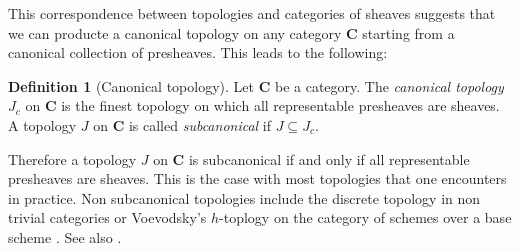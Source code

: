 \documentclass[12pt,reqno,a4paper]{amsart}
\theoremstyle{plain}
\theoremstyle{definition}
\newtheorem{defn}[thm]{Definition}
\theoremstyle{remark}
\begin{document}
This correspondence between topologies and categories of sheaves suggests that we can producte a canonical topology on any category $\mathbf{C}$ starting from a canonical collection of presheaves.
This leads to the following:

\begin{defn}[Canonical topology]
  Let $\mathbf{C}$ be a category.
  The \textit{canonical topology} $J_{c}$ on $\mathbf{C}$ is the finest topology on which all representable presheaves are sheaves.
  A topology $J$ on $\mathbf{C}$ is called \textit{subcanonical} if $J \subseteq J_{c}$.
\end{defn}

Therefore a topology $J$ on $\mathbf{C}$ is subcanonical if and only if all representable presheaves are sheaves.
This is the case with most topologies that one encounters in practice.
Non subcanonical topologies include the discrete topology in non trivial categories or Voevodsky's $h$-toplogy on the category of schemes over a base scheme \cite[\href{https://stacks.math.columbia.edu/tag/0EV1}{Tag 0EV1}]{stacks-project}.
See also \cite{hj14}.

\printbibliography
\vfill
\end{document}
